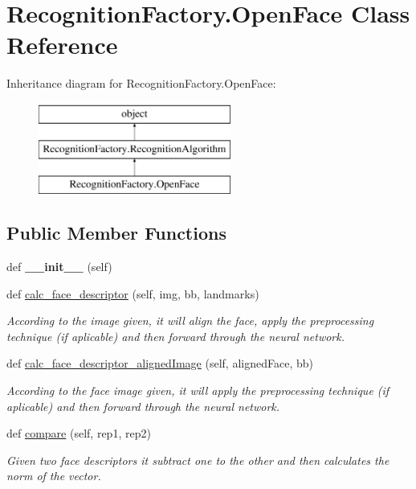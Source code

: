 \hypertarget{classRecognitionFactory_1_1OpenFace}{}\section{Recognition\+Factory.\+Open\+Face Class Reference}
\label{classRecognitionFactory_1_1OpenFace}
Inheritance diagram for Recognition\+Factory.\+Open\+Face\+:\begin{figure}[H]
\begin{center}
\leavevmode
\includegraphics[height=3.000000cm]{classRecognitionFactory_1_1OpenFace}
\end{center}
\end{figure}
\subsection*{Public Member Functions}
\begin{DoxyCompactItemize}
\item 
def {\bfseries \+\_\+\+\_\+init\+\_\+\+\_\+} (self)\hypertarget{classRecognitionFactory_1_1OpenFace_a555a6f98154c13480cd0221bbb616cdc}{}\label{classRecognitionFactory_1_1OpenFace_a555a6f98154c13480cd0221bbb616cdc}

\item 
def \hyperlink{classRecognitionFactory_1_1OpenFace_a836912f1319b9a6b433439514b411e85}{calc\+\_\+face\+\_\+descriptor} (self, img, bb, landmarks)
\begin{DoxyCompactList}\small\item\em According to the image given, it will align the face, apply the preprocessing technique (if aplicable) and then forward through the neural network. \end{DoxyCompactList}\item 
def \hyperlink{classRecognitionFactory_1_1OpenFace_aaf88498d63d98982547f19ee314e5bba}{calc\+\_\+face\+\_\+descriptor\+\_\+aligned\+Image} (self, aligned\+Face, bb)
\begin{DoxyCompactList}\small\item\em According to the face image given, it will apply the preprocessing technique (if aplicable) and then forward through the neural network. \end{DoxyCompactList}\item 
def \hyperlink{classRecognitionFactory_1_1OpenFace_afa0790d2f75b5191265048c584dbb858}{compare} (self, rep1, rep2)
\begin{DoxyCompactList}\small\item\em Given two face descriptors it subtract one to the other and then calculates the norm of the vector. \end{DoxyCompactList}\end{DoxyCompactItemize}
